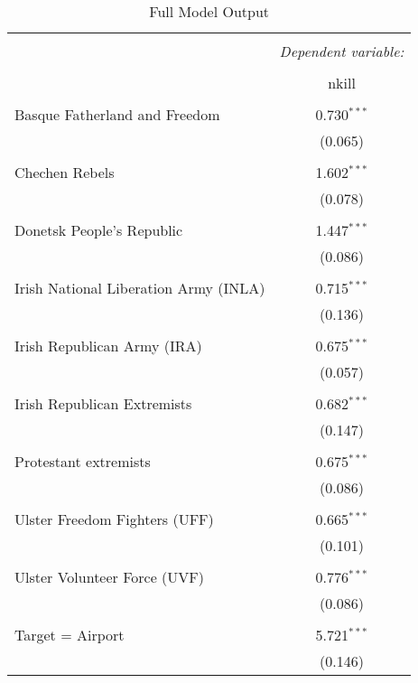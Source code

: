 
\begin{table}[!htbp] \centering 
  \caption{Full Model Output} 
  \label{} 
\begin{tabular}{@{\extracolsep{5pt}}lc} 
\\[-1.8ex]\hline 
\hline \\[-1.8ex] 
 & \multicolumn{1}{c}{\textit{Dependent variable:}} \\ 
\cline{2-2} 
\\[-1.8ex] & nkill \\ 
\hline \\[-1.8ex] 
 Basque Fatherland and Freedom & 0.730$^{***}$ \\ 
  & (0.065) \\ 
  & \\ 
 Chechen Rebels & 1.602$^{***}$ \\ 
  & (0.078) \\ 
  & \\ 
 Donetsk People's Republic & 1.447$^{***}$ \\ 
  & (0.086) \\ 
  & \\ 
 Irish National Liberation Army (INLA) & 0.715$^{***}$ \\ 
  & (0.136) \\ 
  & \\ 
 Irish Republican Army (IRA) & 0.675$^{***}$ \\ 
  & (0.057) \\ 
  & \\ 
 Irish Republican Extremists & 0.682$^{***}$ \\ 
  & (0.147) \\ 
  & \\ 
 Protestant extremists & 0.675$^{***}$ \\ 
  & (0.086) \\ 
  & \\ 
 Ulster Freedom Fighters (UFF) & 0.665$^{***}$ \\ 
  & (0.101) \\ 
  & \\ 
 Ulster Volunteer Force (UVF) & 0.776$^{***}$ \\ 
  & (0.086) \\ 
  & \\ 
 Target = Airport & 5.721$^{***}$ \\ 
  & (0.146) \\ 

\end{tabular}
\end{table}
